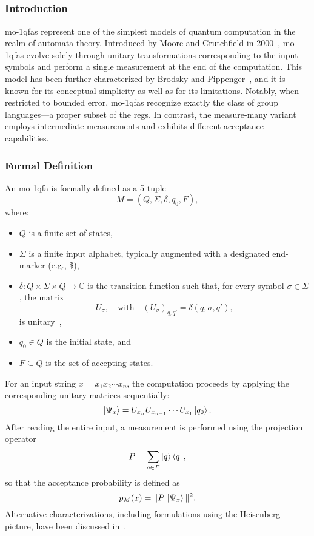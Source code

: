 \subsection{}
\label{sec:moqfa}

\subsubsection{Introduction}
\glspl{mo-1qfa} represent one of the simplest models of quantum computation in the realm of automata theory. Introduced by Moore and Crutchfield in 2000~\cite{moore2000quantum}, \glspl{mo-1qfa} evolve solely through unitary transformations corresponding to the input symbols and perform a single measurement at the end of the computation. This model has been further characterized by Brodsky and Pippenger~\cite{brodsky2002characterizations}, and it is known for its conceptual simplicity as well as for its limitations. Notably, when restricted to bounded error, \glspl{mo-1qfa} recognize exactly the class of group languages—a proper subset of the \glspl{reg}. In contrast, the measure-many variant ~\cite{kondacs1997power} employs intermediate measurements and exhibits different acceptance capabilities.

\subsubsection{Formal Definition}
An \gls{mo-1qfa} is formally defined as a 5-tuple 
\[
M = (Q,\Sigma,\delta,q_0,F),
\]
where:
\begin{itemize}
    \item $Q$ is a finite set of states,
    \item $\Sigma$ is a finite input alphabet, typically augmented with a designated end-marker (e.g., \$),
    \item $\delta : Q \times \Sigma \times Q \to \mathbb{C}$ is the transition function such that, for every symbol $\sigma\in\Sigma$, the matrix 
    \[
    U_\sigma,\quad \text{with} \quad (U_\sigma)_{q,q'} = \delta(q,\sigma,q'),
    \]
    is unitary~\cite{moore2000quantum},
    \item $q_0 \in Q$ is the initial state, and
    \item $F\subseteq Q$ is the set of accepting states.
\end{itemize}
For an input string $x=x_1x_2\cdots x_n$, the computation proceeds by applying the corresponding unitary matrices sequentially:
\[
\ket{\Psi_x} = U_{x_n}U_{x_{n-1}}\cdots U_{x_1}\ket{q_0}.
\]
After reading the entire input, a measurement is performed using the projection operator
\[
P=\sum_{q\in F} \ket{q}\bra{q},
\]
so that the acceptance probability is defined as
\[
p_M(x)=\|P\,\ket{\Psi_x}\|^2.
\]
Alternative characterizations, including formulations using the Heisenberg picture, have been discussed in~\cite{qiu2004characterizations,piazza2022mirrors}.

